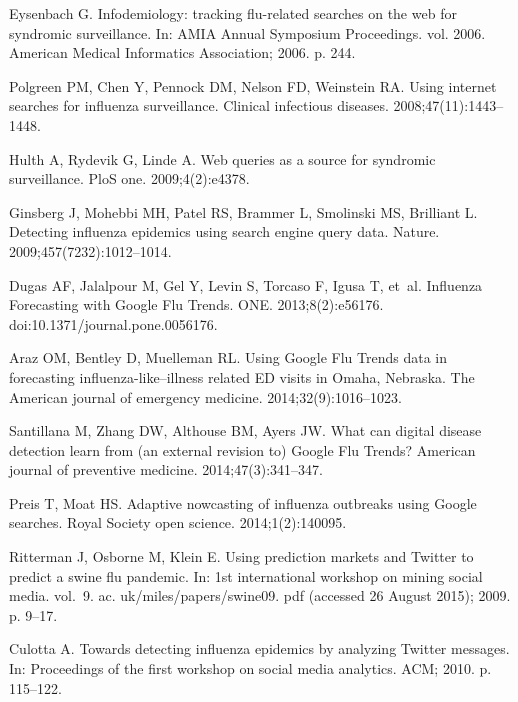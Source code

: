 \documentclass[10pt,letterpaper]{article}
\begin{document}
\begin{thebibliography}{10}
Eysenbach G.
\newblock Infodemiology: tracking flu-related searches on the web for syndromic
  surveillance.
\newblock In: AMIA Annual Symposium Proceedings. vol. 2006. American Medical
  Informatics Association; 2006. p. 244.

Polgreen PM, Chen Y, Pennock DM, Nelson FD, Weinstein RA.
\newblock Using internet searches for influenza surveillance.
\newblock Clinical infectious diseases. 2008;47(11):1443--1448.

Hulth A, Rydevik G, Linde A.
\newblock Web queries as a source for syndromic surveillance.
\newblock PloS one. 2009;4(2):e4378.

Ginsberg J, Mohebbi MH, Patel RS, Brammer L, Smolinski MS, Brilliant L.
\newblock Detecting influenza epidemics using search engine query data.
\newblock Nature. 2009;457(7232):1012--1014.

Dugas AF, Jalalpour M, Gel Y, Levin S, Torcaso F, Igusa T, et~al.
\newblock Influenza Forecasting with Google Flu Trends.
 {ONE}. 2013;8(2):e56176.
\newblock doi:{10.1371/journal.pone.0056176}.

Araz OM, Bentley D, Muelleman RL.
\newblock Using Google Flu Trends data in forecasting influenza-like--illness
  related ED visits in Omaha, Nebraska.
\newblock The American journal of emergency medicine. 2014;32(9):1016--1023.

Santillana M, Zhang DW, Althouse BM, Ayers JW.
\newblock What can digital disease detection learn from (an external revision
  to) Google Flu Trends?
\newblock American journal of preventive medicine. 2014;47(3):341--347.

Preis T, Moat HS.
\newblock Adaptive nowcasting of influenza outbreaks using Google searches.
\newblock Royal Society open science. 2014;1(2):140095.

Ritterman J, Osborne M, Klein E.
\newblock Using prediction markets and Twitter to predict a swine flu pandemic.
\newblock In: 1st international workshop on mining social media. vol.~9. ac.
  uk/miles/papers/swine09. pdf (accessed 26 August 2015); 2009. p. 9--17.

Culotta A.
\newblock Towards detecting influenza epidemics by analyzing Twitter messages.
\newblock In: Proceedings of the first workshop on social media analytics. ACM;
  2010. p. 115--122.


\end{thebibliography}
\end{document}
